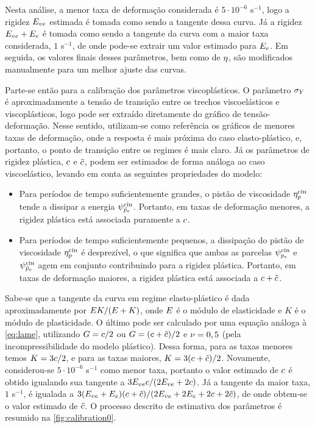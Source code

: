 \documentclass[Tese.tex]{subfiles}
\begin{document}
{Nesta análise, a menor taxa de deformação considerada é $5\cdot 10^{-6}$ s$^{-1}$, logo a rigidez $E_{ve}$ estimada é tomada como sendo a tangente dessa curva. Já a rigidez $E_{ve}+E_e$ é tomada como sendo a tangente da curva com a maior taxa considerada, $1$ s$^{-1}$, de onde pode-se extrair um valor estimado para $E_e$. Em seguida, os valores finais desses parâmetros, bem como de $\eta$, são modificados manualmente para um melhor ajuste das curvas.

Parte-se então para a calibração dos parâmetros viscoplásticos. O parâmetro $\sigma_Y$ é aproximadamente a tensão de transição entre os trechos viscoelásticos e viscoplásticos, logo pode ser extraído diretamente do gráfico de tensão-deformação. Nesse sentido, utilizam-se como referência os gráficos de menores taxas de deformação, onde a resposta é mais próxima do caso elasto-plástico, e, portanto, o ponto de transição entre os regimes é mais claro. Já os parâmetros de rigidez plástica, $c$ e $\tilde{c}$, podem ser estimados de forma análoga ao caso viscoelástico, levando em conta as seguintes propriedades do modelo:

\begin{itemize}
	\item Para períodos de tempo suficientemente grandes, o pistão de viscosidade $\eta_{p}^\text{cin}$ tende a dissipar a energia $\psi_{\tilde{p}_e}^\text{cin}$. Portanto, em taxas de deformação menores, a rigidez plástica está associada puramente a $c$.
	\item Para períodos de tempo suficientemente pequenos, a dissipação do pistão de viscosidade $\eta_{p}^\text{cin}$ é desprezível, o que significa que ambas as parcelas $\psi_{p_e}^\text{cin}$ e $\psi_{\tilde{p}_e}^\text{cin}$ agem em conjunto contribuindo para a rigidez plástica. Portanto, em taxas de deformação maiores, a rigidez plástica está associada a $c+\tilde{c}$.
\end{itemize}

Sabe-se que a tangente da curva em regime elasto-plástico é dada aproximadamente por $E K/(E+K)$, onde $E$ é o módulo de elasticidade e $K$ é o módulo de plasticidade. O último pode ser calculado por uma equação análoga à \eqref{eq:lame}, utilizando $G = c/2$ ou $G=(c+\tilde{c})/2$ e $\nu=0,5$ (pela incompressibilidade do modelo plástico). Dessa forma, para as taxas menores temos $K=3c/2$, e para as taxas maiores, $K=3(c+\tilde{c})/2$. Novamente, considerou-se $5\cdot 10^{-6}$ s$^{-1}$ como menor taxa, portanto o valor estimado de $c$ é obtido igualando sua tangente a $3E_{ve}c/(2E_{ve}+2c)$. Já a tangente da maior taxa, $1$ s$^{-1}$, é igualada a $3(E_{ve}+E_e)(c+\tilde{c})/(2E_{ve}+2E_e+2c+2\tilde{c})$, de onde obtem-se o valor estimado de $\tilde{c}$. O processo descrito de estimativa dos parâmetros é resumido na \autoref{fig:calibration0}.

}
\end{document}
